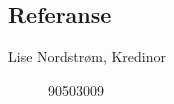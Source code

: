 \documentclass[margin,line,a4paper]{resume}
\begin{document}
\begin{resume}
\section{\mysidestyle Referanse}%
\begin{description}
\item[Lise Nordstrøm, Kredinor] 90503009
\end{description}
\end{resume}
\end{document}
